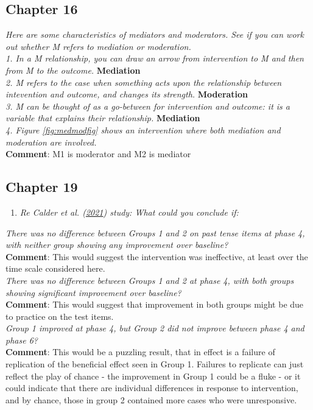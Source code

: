\documentclass{krantz}
\providecommand{\tightlist}{%
\setlength{\itemsep}{0pt}\setlength{\parskip}{0pt}}
\begin{document}
\hypertarget{chapter-16}{%
\subsection{Chapter 16}\label{chapter-16}}

\emph{Here are some characteristics of mediators and moderators. See if you can work out whether M refers to mediation or moderation.}\\
\emph{1. In a M relationship, you can draw an arrow from intervention to M and then from M to the outcome.} \textbf{Mediation}\\
\emph{2. M refers to the case when something acts upon the relationship between intevention and outcome, and changes its strength.} \textbf{Moderation}\\
\emph{3. M can be thought of as a go-between for intervention and outcome: it is a variable that explains their relationship.} \textbf{Mediation}\\
\emph{4. Figure \ref{fig:medmodfig} shows an intervention where both mediation and moderation are involved.}\\
\textbf{Comment}: M1 is moderator and M2 is mediator

\hypertarget{chapter-19}{%
\subsection{Chapter 19}\label{chapter-19}}

\begin{enumerate}
\def\labelenumi{\arabic{enumi}.}
\tightlist
\item
  \emph{Re Calder et al. (\protect\hyperlink{ref-calder2021}{2021}) study: What could you conclude if:}
\end{enumerate}

\emph{There was no difference between Groups 1 and 2 on past tense items at phase 4, with neither group showing any improvement over baseline?}\\
\textbf{Comment}: This would suggest the intervention was ineffective, at least over the time scale considered here.\\
\emph{There was no difference between Groups 1 and 2 at phase 4, with both groups showing significant improvement over baseline?}\\
\textbf{Comment}: This would suggest that improvement in both groups might be due to practice on the test items.\\
\emph{Group 1 improved at phase 4, but Group 2 did not improve between phase 4 and phase 6?}\\
\textbf{Comment}: This would be a puzzling result, that in effect is a failure of replication of the beneficial effect seen in Group 1. Failures to replicate can just reflect the play of chance - the improvement in Group 1 could be a fluke - or it could indicate that there are individual differences in response to intervention, and by chance, those in group 2 contained more cases who were unresponsive.
\end{document}

